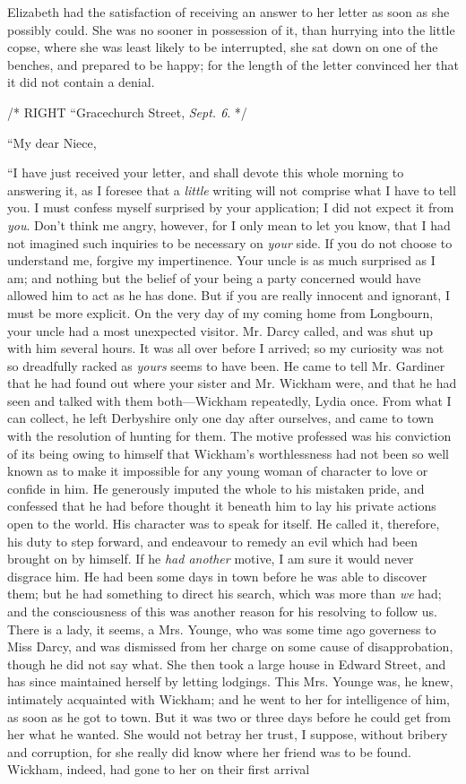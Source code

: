 Elizabeth had the satisfaction of receiving an answer to her letter as soon as she possibly could. She was no sooner in possession of it, than hurrying into the little copse, where she was least likely to be interrupted, she sat down on one of the benches, and prepared to be happy; for the length of the letter convinced her that it did not contain a denial.

/* RIGHT ``Gracechurch Street, \textit{Sept. 6}. */

``My dear Niece,

``I have just received your letter, and shall devote this whole morning to answering it, as I foresee that a \textit{little} writing will not comprise what I have to tell you. I must confess myself surprised by your application; I did not expect it from \textit{you}. Don't think me angry, however, for I only mean to let you know, that I had not imagined such inquiries to be necessary on \textit{your} side. If you do not choose to understand me, forgive my impertinence. Your uncle is as much surprised as I am; and nothing but the belief of your being a party concerned would have allowed him to act as he has done. But if you are really innocent and ignorant, I must be more explicit. On the very day of my coming home from Longbourn, your uncle had a most unexpected visitor. Mr. Darcy called, and was shut up with him several hours. It was all over before I arrived; so my curiosity was not so dreadfully racked as \textit{yours} seems to have been. He came to tell Mr. Gardiner that he had found out where your sister and Mr. Wickham were, and that he had seen and talked with them both---Wickham repeatedly, Lydia once. From what I can collect, he left Derbyshire only one day after ourselves, and came to town with the resolution of hunting for them. The motive professed was his conviction of its being owing to himself that Wickham's worthlessness had not been so well known as to make it impossible for any young woman of character to love or confide in him. He generously imputed the whole to his mistaken pride, and confessed that he had before thought it beneath him to lay his private actions open to the world. His character was to speak for itself. He called it, therefore, his duty to step forward, and endeavour to remedy an evil which had been brought on by himself. If he \textit{had another} motive, I am sure it would never disgrace him. He had been some days in town before he was able to discover them; but he had something to direct his search, which was more than \textit{we} had; and the consciousness of this was another reason for his resolving to follow us. There is a lady, it seems, a Mrs. Younge, who was some time ago governess to Miss Darcy, and was dismissed from her charge on some cause of disapprobation, though he did not say what. She then took a large house in Edward Street, and has since maintained herself by letting lodgings. This Mrs. Younge was, he knew, intimately acquainted with Wickham; and he went to her for intelligence of him, as soon as he got to town. But it was two or three days before he could get from her what he wanted. She would not betray her trust, I suppose, without bribery and corruption, for she really did know where her friend was to be found. Wickham, indeed, had gone to her on their first arrival 